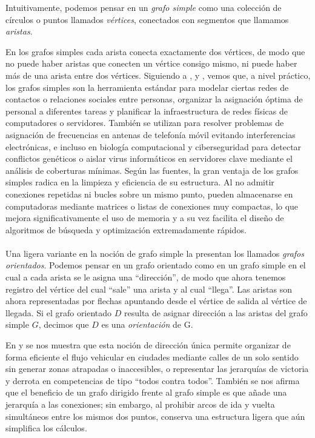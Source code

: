 Intuitivamente, podemos pensar en un \textit{grafo simple} como una colección de círculos o puntos llamados \textit{vértices}, conectados con segmentos que llamamos \textit{aristas}.

En los grafos simples cada arista conecta exactamente dos vértices, de modo que no puede haber aristas que conecten un vértice consigo mismo, ni puede haber más de una arista entre dos vértices. Siguiendo a \cite{Foulds1991}, \cite{Gross2006} y \cite{Pirzada2007}, vemos que, a nivel práctico, los grafos simples son la herramienta estándar para modelar ciertas redes de contactos o relaciones sociales entre personas, organizar la asignación óptima de personal a diferentes tareas y planificar la infraestructura de redes físicas de computadores o servidores. También se utilizan para resolver problemas de asignación de frecuencias en antenas de telefonía móvil evitando interferencias electrónicas, e incluso en biología computacional y ciberseguridad para detectar conflictos genéticos o aislar virus informáticos en servidores clave mediante el análisis de coberturas mínimas. Según las fuentes, la gran ventaja de los grafos simples radica en la limpieza y eficiencia de su estructura. Al no admitir conexiones repetidas ni bucles sobre un mismo punto, pueden almacenarse en computadoras mediante matrices o listas de conexiones muy compactas, lo que mejora significativamente el uso de memoria y a su vez facilita el diseño de algoritmos de búsqueda y optimización extremadamente rápidos.\\\\
Una ligera variante en la noción de grafo simple la presentan los llamados \textit{grafos orientados}. Podemos pensar en un grafo orientado como en un grafo simple en el cual a cada arista se le asigna una ``dirección'', de modo que ahora tenemos registro del vértice del cual ``sale'' una arista y al cual ``llega''. Las aristas son ahora representadas por flechas apuntando desde el vértice de salida al vértice de llegada. Si el grafo orientado $D$ resulta de asignar dirección a las aristas del grafo simple $G$, decimos que $D$ es una \textit{orientación} de G.

En \cite{Foulds1991} y \cite{Roberts1978} se nos muestra que esta noción de dirección única permite organizar de forma eficiente el flujo vehicular en ciudades mediante calles de un solo sentido sin generar zonas atrapadas o inaccesibles, o representar las jerarquías de victoria y derrota en competencias de tipo ``todos contra todos''. También se nos afirma que el beneficio de un grafo dirigido frente al grafo simple es que añade una jerarquía a las conexiones; sin embargo, al prohibir arcos de ida y vuelta simultáneos entre los mismos dos puntos, conserva una estructura ligera que aún simplifica los cálculos.\\\\

